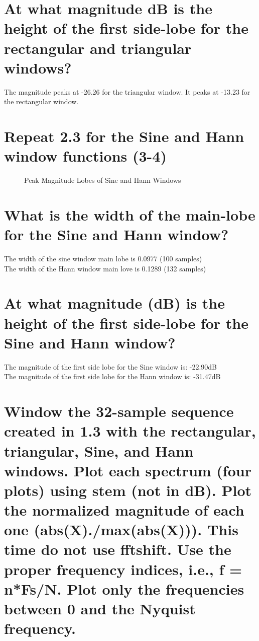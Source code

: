 \documentclass[titlepage]{scrartcl}
\begin{document}
\section{At what magnitude dB is the height of the first side-lobe for the
rectangular and triangular windows?}
The magnitude peaks at -26.26 for the triangular window. It peaks at -13.23 for
the rectangular window.

\section{Repeat 2.3 for the Sine and Hann window functions (3-4)}
\begin{figure}[H]
    \caption{Peak Magnitude Lobes of Sine and Hann Windows}
    \label{SineHannDFT}
\end{figure}

\section{What is the width of the main-lobe for the Sine and Hann window?}
The width of the sine window main lobe is 0.0977 (100 samples)\\
The width of the Hann window main love is 0.1289 (132 samples)

\section{At what magnitude (dB) is the height of the first side-lobe for the
Sine and
Hann window?}
The magnitude of the first side lobe for the Sine window is: -22.90dB\\
The magnitude of the first side lobe for the Hann window is: -31.47dB

\section{Window the 32-sample sequence created in 1.3 with the rectangular,
triangular, Sine, and Hann windows. Plot each spectrum (four plots) using
stem (not in dB). Plot the normalized magnitude of each one
(abs(X)./max(abs(X))). This time do not use fftshift. Use the proper
frequency indices, i.e., f = n*Fs/N. Plot only the frequencies between 0 and
the Nyquist frequency.}
\end{document}
